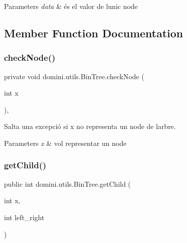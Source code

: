 \begin{DoxyParams}{Parameters}
{\em data} & és el valor de l\textquotesingle{}unic node \\
\hline
\end{DoxyParams}


\subsection{Member Function Documentation}
\mbox{\label{classdomini_1_1utils_1_1BinTree_a32b3e2ad7dfee3425e0b1f6f8b5100f5}} 
\subsubsection{\texorpdfstring{check\+Node()}{checkNode()}}
{\footnotesize\ttfamily private void domini.\+utils.\+Bin\+Tree.\+check\+Node (\begin{DoxyParamCaption}\item[{int}]{x }\end{DoxyParamCaption})\hspace{0.3cm}{\ttfamily [inline]}, {\ttfamily [private]}}



Salta una excepció si x no representa un node de l\textquotesingle{}arbre. 


\begin{DoxyParams}{Parameters}
{\em x} & vol representar un node \\
\hline
\end{DoxyParams}
\mbox{\label{classdomini_1_1utils_1_1BinTree_aee1ed36b9433869f94a6ee8a6815d872}} 
\subsubsection{\texorpdfstring{get\+Child()}{getChild()}}
{\footnotesize\ttfamily public int domini.\+utils.\+Bin\+Tree.\+get\+Child (\begin{DoxyParamCaption}\item[{int}]{x,  }\item[{int}]{left\+\_\+right }\end{DoxyParamCaption})\hspace{0.3cm}{\ttfamily [inline]}}



